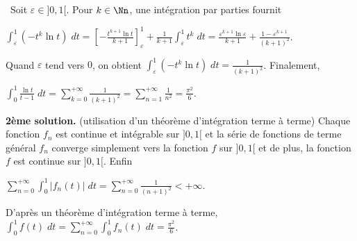 {{\textbullet~Soit $\varepsilon\in]0,1[$. Pour $k\in\Nn$, une intégration par parties fournit

\begin{center}
$\int_{\varepsilon}^{1}(-t^k\ln t)\;dt=\left[-\frac{t^{k+1}\ln t}{k+1}\right]_\varepsilon^{1}+\frac{1}{k+1}\int_{\varepsilon}^{1}t^k\;dt=\frac{\varepsilon^{k+1}\ln \varepsilon}{k+1}+\frac{1-\varepsilon^{k+1}}{(k+1)^2}$.
\end{center}

Quand $\varepsilon$ tend vers $0$, on obtient $\int_{\varepsilon}^{1}(-t^k\ln t)\;dt=\frac{1}{(k+1)^2}$. Finalement,

\begin{center}
$\int_{0}^{1}\frac{\ln t}{t-1}\;dt=\sum_{k=0}^{+\infty}\frac{1}{(k+1)^2}=\sum_{n=1}^{+\infty}\frac{1}{n^2}=\frac{\pi^2}{6}$.
\end{center}

\begin{center}
\end{center}

\textbf{2ème solution.} (utilisation d'un théorème d'intégration terme à terme) Chaque fonction $f_n$ est continue et intégrable sur $]0,1[$ et la série de fonctions de terme général $f_n$ converge simplement vers la fonction $f$ sur $]0,1[$ et de plus, la fonction $f$ est continue sur $]0,1[$. Enfin

\begin{center}
$\sum_{n=0}^{+\infty}\int_{0}^{1}|f_n(t)|\;dt=\sum_{n=0}^{+\infty}\frac{1}{(n+1)^2}<+\infty$.
\end{center}

D'après un théorème d'intégration terme à terme, $\int_{0}^{1}f(t)\;dt=\sum_{n=0}^{+\infty}\int_{0}^{1}f_n(t)\;dt=\frac{\pi^2}{6}$.}
}